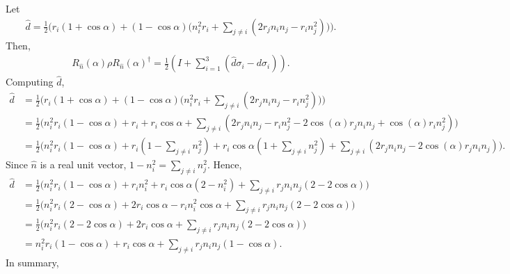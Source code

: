 Let
\begin{align}
    \hat d = \frac{1}{2} \Big( r_i (1 + \cos\alpha) +
        (1 - \cos\alpha) \big(
            n_i^2r_i + \sum_{j \neq i} (2 r_j n_i n_j - r_i n_j^2)
        \big)
    \Big) .
\end{align}
Then,
\begin{align}
    R_{\hat n}(\alpha) \rho R_{\hat n}(\alpha)^\dagger =
        \frac{1}{2} \left(I + \sum_{i=1}^3 (\hat{d}\sigma_i - d\sigma_i) \right).
\end{align}
Computing $\hat d$,
\begin{align}
    \hat{d} &= \frac{1}{2} \Big( r_i (1 + \cos\alpha) +
        (1 - \cos\alpha) \big(
            n_i^2r_i + \sum_{j \neq i} (2 r_j n_i n_j - r_i n_j^2)
        \big) \Big) \\
    &= \frac{1}{2} \Big(
        n_i^2r_i(1 - \cos\alpha) +
        r_i + r_i\cos\alpha +
        \sum_{j \neq i} (2 r_j n_i n_j - r_i n_j^2 -
            2 \cos(\alpha) r_j n_i n_j + \cos(\alpha) r_i n_j^2
        ) \Big) \\
    &= \frac{1}{2} \Big(
        n_i^2r_i(1 - \cos\alpha) +
        r_i \left(1 - \sum_{j \neq i} n_j^2\right) +
        r_i \cos\alpha \left(1 + \sum_{j \neq i} n_j^2 \right) +
        \sum_{j \neq i} (
            2 r_j n_i n_j - 2 \cos(\alpha) r_j n_i n_j
        ) \Big) .
\end{align}
Since $\hat n$ is a real unit vector,
$1 - n_i^2 = \sum_{j \neq i} n_j^2$.
Hence,
\begin{align}
    \hat{d} &= \frac{1}{2} \Big(
        n_i^2r_i(1 - \cos\alpha) +
        r_i n_i^2 +
        r_i \cos\alpha \left(2 - n_i^2 \right) +
        \sum_{j \neq i} r_j n_i n_j ( 2  - 2 \cos\alpha ) \Big) \\
    &= \frac{1}{2} \Big(
        n_i^2r_i(2 - \cos\alpha) +
        2 r_i \cos\alpha - r_i n_i^2 \cos\alpha +
        \sum_{j \neq i} r_j n_i n_j ( 2  - 2 \cos\alpha ) \Big) \\
    &= \frac{1}{2} \Big(
        n_i^2r_i(2 - 2 \cos\alpha) +
        2 r_i \cos\alpha +
        \sum_{j \neq i} r_j n_i n_j ( 2  - 2 \cos\alpha ) \Big) \\
    &= n_i^2r_i(1 - \cos\alpha) +
        r_i \cos\alpha +
        \sum_{j \neq i} r_j n_i n_j ( 1  - \cos\alpha ) .
\end{align}
In summary,
